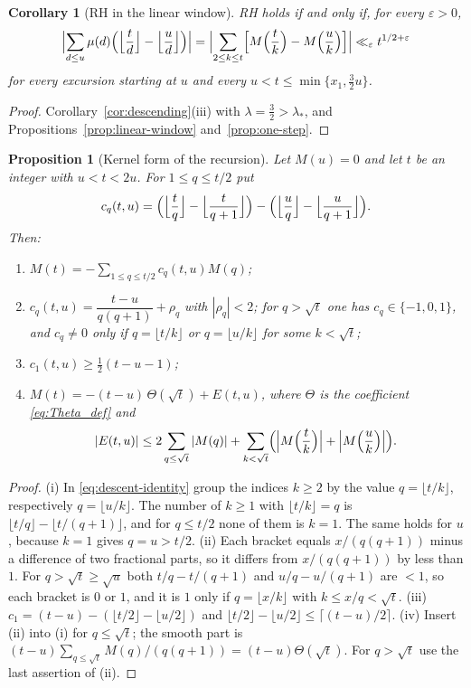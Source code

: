 \documentclass[11pt]{amsart}
\numberwithin{equation}{section}
\theoremstyle{plain}
\newtheorem{proposition}[theorem]{Proposition}
\newtheorem{corollary}[theorem]{Corollary}
\theoremstyle{definition}
\theoremstyle{remark}
\newcommand{\eps}{\varepsilon}
\begin{document}
\begin{corollary}[RH in the linear window]
\label{cor:linear-window-RH}
RH holds if and only if, for every $\eps>0$,
\[
\Bigl|\sum_{d\le u}\mu(d)\Bigl(\Bigl\lfloor\frac td\Bigr\rfloor
-\Bigl\lfloor\frac ud\Bigr\rfloor\Bigr)\Bigr|
=\Bigl|\sum_{2\le k\le t}\Bigl[M\Bigl(\frac tk\Bigr)-M\Bigl(\frac uk\Bigr)\Bigr]\Bigr|
\ll_\eps t^{1/2+\eps}
\]
for every excursion starting at $u$ and every
$u<t\le\min\{x_{1},\frac32u\}$.
\end{corollary}

\begin{proof}
Corollary~\ref{cor:descending}(iii) with $\lambda=\frac32>\lambda_*$, and
Propositions~\ref{prop:linear-window} and~\ref{prop:one-step}.
\end{proof}

\begin{proposition}[Kernel form of the recursion]
\label{prop:kernel}
Let $M(u)=0$ and let $t$ be an integer with $u<t<2u$. For $1\le q\le t/2$ put
\[
c_q(t,u)=\Bigl(\Bigl\lfloor\frac tq\Bigr\rfloor-\Bigl\lfloor\frac t{q+1}\Bigr\rfloor\Bigr)
-\Bigl(\Bigl\lfloor\frac uq\Bigr\rfloor-\Bigl\lfloor\frac u{q+1}\Bigr\rfloor\Bigr).
\]
Then:
\begin{enumerate}[label=\textup{(\roman*)}]
\item $M(t)=-\sum_{1\le q\le t/2}c_q(t,u)M(q)$;
\item $c_q(t,u)=\dfrac{t-u}{q(q+1)}+\rho_q$ with $|\rho_q|<2$; for $q>\sqrt t$
one has $c_q\in\{-1,0,1\}$, and $c_q\ne0$ only if $q=\lfloor t/k\rfloor$ or
$q=\lfloor u/k\rfloor$ for some $k<\sqrt t$;
\item $c_1(t,u)\ge\frac12(t-u-1)$;
\item $M(t)=-(t-u)\,\Theta(\sqrt t)+E(t,u)$, where $\Theta$ is the
coefficient \eqref{eq:Theta_def} and
\[
|E(t,u)|\le2\sum_{q\le\sqrt t}|M(q)|
+\sum_{k<\sqrt t}\Bigl(\Bigl|M\Bigl(\frac tk\Bigr)\Bigr|+\Bigl|M\Bigl(\frac uk\Bigr)\Bigr|\Bigr).
\]
\end{enumerate}
\end{proposition}

\begin{proof}
(i) In \eqref{eq:descent-identity} group the indices $k\ge2$ by the value
$q=\lfloor t/k\rfloor$, respectively $q=\lfloor u/k\rfloor$. The number of
$k\ge1$ with $\lfloor t/k\rfloor=q$ is
$\lfloor t/q\rfloor-\lfloor t/(q+1)\rfloor$, and for $q\le t/2$ none of them
is $k=1$. The same holds for $u$, because $k=1$ gives $q=u>t/2$. (ii) Each
bracket equals $x/(q(q+1))$ minus a difference of two fractional parts, so
it differs from $x/(q(q+1))$ by less than $1$. For $q>\sqrt t\ge\sqrt u$ both
$t/q-t/(q+1)$ and $u/q-u/(q+1)$ are $<1$, so each bracket is $0$ or $1$, and
it is $1$ only if $q=\lfloor x/k\rfloor$ with $k\le x/q<\sqrt t$.
(iii) $c_1=(t-u)-(\lfloor t/2\rfloor-\lfloor u/2\rfloor)$ and
$\lfloor t/2\rfloor-\lfloor u/2\rfloor\le\lceil(t-u)/2\rceil$.
(iv) Insert (ii) into (i) for $q\le\sqrt t$; the smooth part is
$(t-u)\sum_{q\le\sqrt t}M(q)/(q(q+1))=(t-u)\Theta(\sqrt t)$. For
$q>\sqrt t$ use the last assertion of (ii).
\end{proof}
\end{document}
